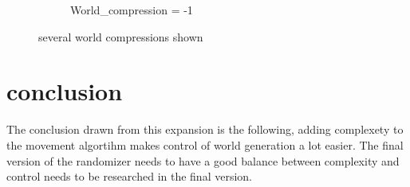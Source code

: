 \documentclass[8pt,letterpaper]{article}
\begin{document}
\begin{figure}[!h]
\begin{subfigure}[b]{0.32\textwidth}
		\caption{World\_compression = -1}
	\end{subfigure}
\caption{several world compressions shown}
\label{fig:3_worlds}
\end{figure}
\section{conclusion}
The conclusion drawn from this expansion is the following, adding complexety to the movement algortihm makes control of world generation a lot easier. The final version of the randomizer needs to have a good balance between complexity and control needs to be researched in the final version.
\end{document}

